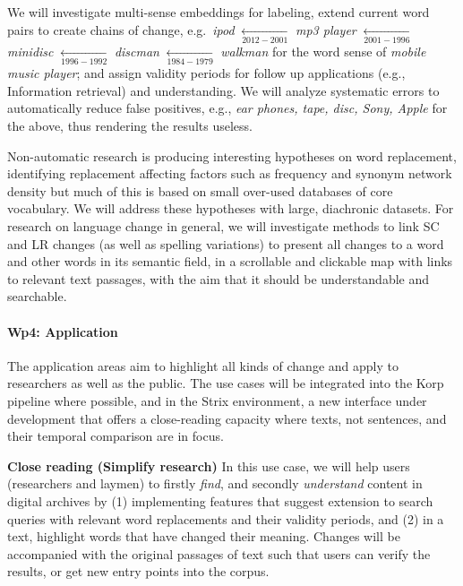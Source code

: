 \documentclass[12pt,twoside,a4paper]{article}
\newcommand\eg{{e.g.\ }}
\begin{document}
	
	We will investigate multi-sense embeddings for labeling, extend current word pairs to create chains of change, \eg {\em ipod}  $ \xleftarrow[2012-2001]{}$ {\em mp3 player}  $ \xleftarrow[2001-1996]{}  $ {\em minidisc} $\xleftarrow[1996-1992]{}$ {\em discman}
	$\xleftarrow[1984-1979]{}$ {\em walkman} for the word sense of \textit{mobile music player}; and assign validity periods for follow up applications (e.g., Information retrieval) and understanding. 
		We will analyze systematic errors to automatically reduce false positives, e.g., \textit{ear phones, tape, disc, Sony, Apple} for the above, thus rendering the results useless.
		
%	
    Non-automatic research is producing interesting hypotheses on word replacement, identifying replacement affecting factors such as frequency \citep{pagel-etal-2007} and synonym network density \citep{vejdemo_semantic_2016} but much of this is based on small over-used databases of core vocabulary. We will address these hypotheses with large, diachronic datasets. 	For research on language change in general, we will investigate methods to link SC and LR changes (as well as spelling variations) to present all changes to a word and other words in its semantic field, in a scrollable and clickable map with links to relevant text passages, with the aim that it should be understandable and searchable. 
\vspace{-0.3cm}		
	\paragraph{Wp4: Application} 
	The application areas aim to highlight all kinds of change and apply to researchers as well as the public. The use cases will be integrated into the Korp pipeline \citep{korp} where possible, and in the Strix environment, a new interface under development that offers a close-reading capacity where texts, not sentences, and their temporal comparison are in focus. %
	
	\textbf{Close reading (Simplify research)}
	In this use case, we will help users (researchers and laymen) to firstly \textit{find}, and secondly \textit{understand} content in digital archives by (1) implementing features that suggest extension to search queries with relevant word replacements and their validity periods, and (2) in a text,  highlight words that have changed their meaning. Changes will be accompanied with the original passages of text such that users can verify the results, or get new entry points into the corpus.
	
\end{document}
